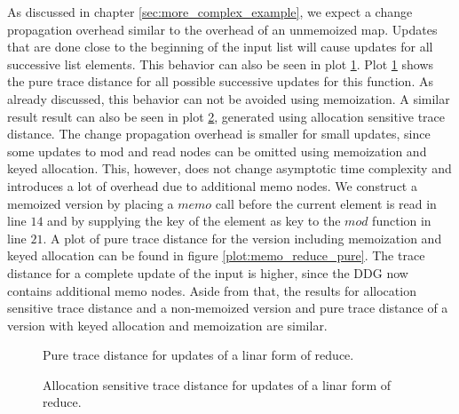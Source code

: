 As discussed in chapter \ref{sec:more_complex_example}, we expect a change propagation overhead similar to the overhead of an unmemoized map. Updates that are done close to the beginning of the input list will cause updates for all successive list elements. This behavior can also be seen in plot \ref{plot:reduce_pure}. Plot \ref{plot:reduce_pure} shows the pure trace distance for all possible successive updates for this function. As already discussed, this behavior can not be avoided using memoization. A similar result result can also be seen in plot \ref{plot:reduce_alloc}, generated using allocation sensitive trace distance. The change propagation overhead is smaller for small updates, since some updates to mod and read nodes can be omitted using memoization and keyed allocation. This, however, does not change asymptotic time complexity and introduces a lot of overhead due to additional memo nodes. We construct a memoized version by placing a $memo$ call before the current element is read in line $14$ and by supplying the key of the element as key to the $mod$ function in line $21$. A plot of pure trace distance for the version including memoization and keyed allocation can be found in figure \ref{plot:memo_reduce_pure}. The trace distance for a complete update of the input is higher, since the DDG now contains additional memo nodes. Aside from that, the results for allocation sensitive trace distance and a non-memoized version and pure trace distance of a version with keyed allocation and memoization are similar. 

\begin{figure}
\centering
{}
\caption{Pure trace distance for updates of a linar form of reduce.}
\label{plot:reduce_pure}
\end{figure}

\begin{figure}
\centering
{}
\caption{Allocation sensitive trace distance for updates of a linar form of reduce.}
\label{plot:reduce_alloc}
\end{figure}

